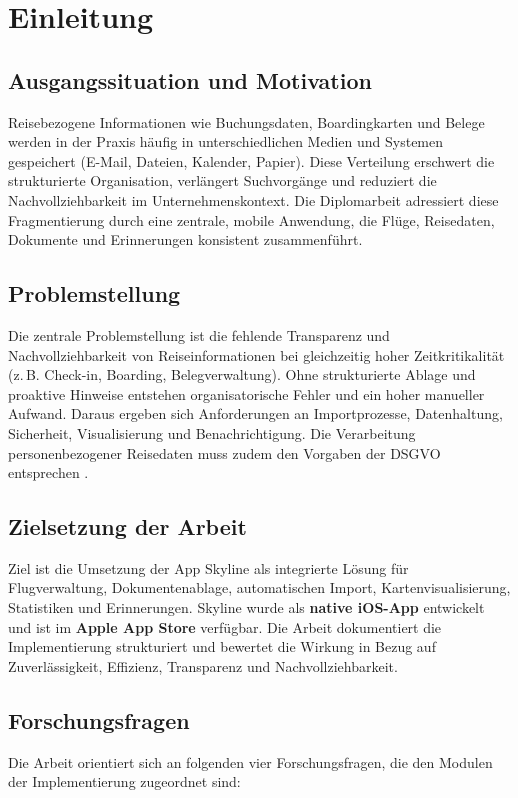 \chapter{Einleitung}\label{chapter:einleitung}

\section{Ausgangssituation und Motivation}
Reisebezogene Informationen wie Buchungsdaten, Boardingkarten und Belege werden
in der Praxis häufig in unterschiedlichen Medien und Systemen gespeichert
(E-Mail, Dateien, Kalender, Papier). Diese Verteilung erschwert die strukturierte
Organisation, verlängert Suchvorgänge und reduziert die Nachvollziehbarkeit
im Unternehmenskontext. Die Diplomarbeit adressiert diese Fragmentierung durch
eine zentrale, mobile Anwendung, die Flüge, Reisedaten, Dokumente und
Erinnerungen konsistent zusammenführt.

\section{Problemstellung}
Die zentrale Problemstellung ist die fehlende Transparenz und Nachvollziehbarkeit
von Reiseinformationen bei gleichzeitig hoher Zeitkritikalität (z.\,B. Check-in,
Boarding, Belegverwaltung). Ohne strukturierte Ablage und proaktive Hinweise
entstehen organisatorische Fehler und ein hoher manueller Aufwand. Daraus
ergeben sich Anforderungen an Importprozesse, Datenhaltung, Sicherheit,
Visualisierung und Benachrichtigung.
Die Verarbeitung personenbezogener Reisedaten muss zudem den Vorgaben der DSGVO
entsprechen \cite{gdpr}.

\section{Zielsetzung der Arbeit}
Ziel ist die Umsetzung der App \glqq Skyline\grqq{} als integrierte Lösung für
Flugverwaltung, Dokumentenablage, automatischen Import, Kartenvisualisierung,
Statistiken und Erinnerungen.
Skyline wurde als \textbf{native iOS-App} entwickelt und ist im
\textbf{Apple App Store} verfügbar.
Die Arbeit dokumentiert die Implementierung strukturiert und bewertet die Wirkung
in Bezug auf Zuverlässigkeit, Effizienz, Transparenz und Nachvollziehbarkeit.

\section{Forschungsfragen}
Die Arbeit orientiert sich an folgenden vier Forschungsfragen, die den Modulen
der Implementierung zugeordnet sind:

